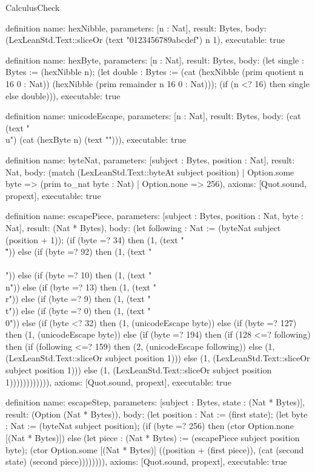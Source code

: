 \begin{lexlean}{CalculusCheck}
\begin{semanticmodule}
definition{
  name: hexNibble,
  parameters: [n : Nat],
  result: Bytes,
  body: (LexLeanStd.Text::sliceOr (text "0123456789abcdef") n 1),
  executable: true
}

definition{
  name: hexByte,
  parameters: [n : Nat],
  result: Bytes,
  body: (let single : Bytes := (hexNibble n); (let double : Bytes := (cat (hexNibble (prim quotient n 16 0 : Nat)) (hexNibble (prim remainder n 16 0 : Nat))); (if (n <? 16) then single else double))),
  executable: true
}

definition{
  name: unicodeEscape,
  parameters: [n : Nat],
  result: Bytes,
  body: (cat (text "\\u{") (cat (hexByte n) (text "}"))),
  executable: true
}

definition{
  name: byteNat,
  parameters: [subject : Bytes, position : Nat],
  result: Nat,
  body: (match (LexLeanStd.Text::byteAt subject position)
    | Option.some byte => (prim to_nat byte : Nat)
    | Option.none => 256),
  axioms: [Quot.sound, propext],
  executable: true
}

definition{
  name: escapePiece,
  parameters: [subject : Bytes, position : Nat, byte : Nat],
  result: (Nat * Bytes),
  body: (let following : Nat := (byteNat subject (position + 1)); (if (byte =? 34) then (1, (text "\\\"")) else (if (byte =? 92) then (1, (text "\\\\")) else (if (byte =? 10) then (1, (text "\\n")) else (if (byte =? 13) then (1, (text "\\r")) else (if (byte =? 9) then (1, (text "\\t")) else (if (byte =? 0) then (1, (text "\\0")) else (if (byte <? 32) then (1, (unicodeEscape byte)) else (if (byte =? 127) then (1, (unicodeEscape byte)) else (if (byte =? 194) then (if (128 <=? following) then (if (following <=? 159) then (2, (unicodeEscape following)) else (1, (LexLeanStd.Text::sliceOr subject position 1))) else (1, (LexLeanStd.Text::sliceOr subject position 1))) else (1, (LexLeanStd.Text::sliceOr subject position 1)))))))))))),
  axioms: [Quot.sound, propext],
  executable: true
}

definition{
  name: escapeStep,
  parameters: [subject : Bytes, state : (Nat * Bytes)],
  result: (Option (Nat * Bytes)),
  body: (let position : Nat := (first state); (let byte : Nat := (byteNat subject position); (if (byte =? 256) then (ctor Option.none [(Nat * Bytes)]) else (let piece : (Nat * Bytes) := (escapePiece subject position byte); (ctor Option.some [(Nat * Bytes)] ((position + (first piece)), (cat (second state) (second piece)))))))),
  axioms: [Quot.sound, propext],
  executable: true
}


\end{semanticmodule}
\end{lexlean}
